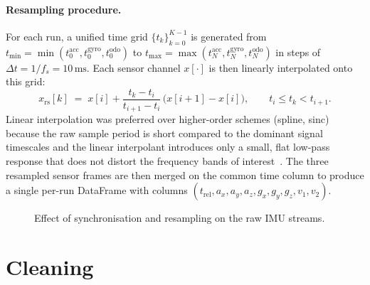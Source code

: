 \paragraph{Resampling procedure.}
For each run, a unified time grid $\{t_k\}_{k=0}^{K-1}$ is generated from $t_{\min} = \min(t_0^{\mathrm{acc}}, t_0^{\mathrm{gyro}}, t_0^{\mathrm{odo}})$ to $t_{\max} = \max(t_N^{\mathrm{acc}}, t_N^{\mathrm{gyro}}, t_N^{\mathrm{odo}})$ in steps of $\Delta t = 1/f_s = 10\,\text{ms}$. Each sensor channel $x[\cdot]$ is then linearly interpolated onto this grid:
\begin{equation}
    x_{\mathrm{rs}}[k]
    \;=\;
    x[i] + \frac{t_k - t_i}{t_{i+1} - t_i}\,\bigl(x[i+1] - x[i]\bigr),
    \qquad
    t_i \le t_k < t_{i+1}.
    \label{eq:linear_interp}
\end{equation}
Linear interpolation was preferred over higher-order schemes (spline, sinc) because the raw sample period is short compared to the dominant signal timescales and the linear interpolant introduces only a small, flat low-pass response that does not distort the frequency bands of interest~\cite{Press2007}. The three resampled sensor frames are then merged on the common time column to produce a single per-run DataFrame with columns $(t_{\mathrm{rel}}, a_x, a_y, a_z, g_x, g_y,\allowbreak g_z, v_1, v_2)$.

\begin{figure}[H]
    \centering
    \caption{Effect of synchronisation and resampling on the raw IMU
    streams.}
    \label{fig:resample_demo}
\end{figure}


\section{Cleaning}
\label{sec:cleaning}

